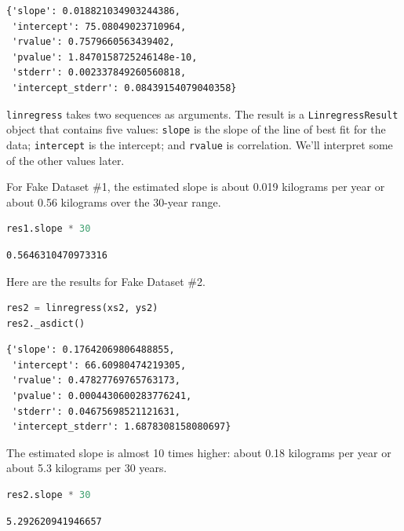 \begin{lstlisting}[style=output]
{'slope': 0.018821034903244386,
 'intercept': 75.08049023710964,
 'rvalue': 0.7579660563439402,
 'pvalue': 1.8470158725246148e-10,
 'stderr': 0.002337849260560818,
 'intercept_stderr': 0.08439154079040358}
\end{lstlisting}

\passthrough{\lstinline!linregress!} takes two sequences as arguments.
The result is a \passthrough{\lstinline!LinregressResult!} object that
contains five values: \passthrough{\lstinline!slope!} is the slope of
the line of best fit for the data; \passthrough{\lstinline!intercept!}
is the intercept; and \passthrough{\lstinline!rvalue!} is correlation.
We'll interpret some of the other values later.

For Fake Dataset \#1, the estimated slope is about 0.019 kilograms per
year or about 0.56 kilograms over the 30-year range.

\begin{lstlisting}[language=Python,style=source]
res1.slope * 30
\end{lstlisting}

\begin{lstlisting}[style=output]
0.5646310470973316
\end{lstlisting}

Here are the results for Fake Dataset \#2.

\begin{lstlisting}[language=Python,style=source]
res2 = linregress(xs2, ys2)
res2._asdict()
\end{lstlisting}

\begin{lstlisting}[style=output]
{'slope': 0.17642069806488855,
 'intercept': 66.60980474219305,
 'rvalue': 0.47827769765763173,
 'pvalue': 0.0004430600283776241,
 'stderr': 0.04675698521121631,
 'intercept_stderr': 1.6878308158080697}
\end{lstlisting}

The estimated slope is almost 10 times higher: about 0.18 kilograms per
year or about 5.3 kilograms per 30 years.

\begin{lstlisting}[language=Python,style=source]
res2.slope * 30
\end{lstlisting}

\begin{lstlisting}[style=output]
5.292620941946657
\end{lstlisting}

